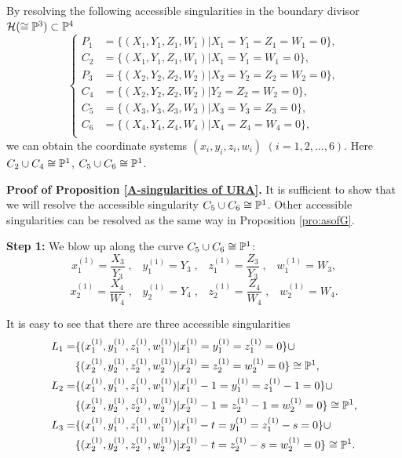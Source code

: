 \begin{prop}\label{A-singularities of URA}
By resolving the following accessible singularities in the boundary divisor ${\mathcal H} (\cong {\Bbb P}^3) \subset {\Bbb P}^4$
\begin{equation}
  \left\{
  \begin{aligned}
   P_1 &=\{(X_1,Y_1,Z_1,W_1)|X_1=Y_1=Z_1=W_1=0 \},\\
   C_2 &=\{(X_1,Y_1,Z_1,W_1)|X_1=Y_1=W_1=0 \},\\
   P_3 &=\{(X_2,Y_2,Z_2,W_2)|X_2=Y_2=Z_2=W_2=0\},\\
   C_4 &=\{(X_2,Y_2,Z_2,W_2)|Y_2=Z_2=W_2=0\},\\
   C_5 &=\{(X_3,Y_3,Z_3,W_3)|X_3=Y_3=Z_3=0\},\\
   C_6 &=\{(X_4,Y_4,Z_4,W_4)|X_4=Z_4=W_4=0\},\\
   \end{aligned}
  \right. 
\end{equation}
we can obtain the coordinate systems $(x_i,y_i,z_i,w_i)$ $(i=1,2,\dots,6)$. Here $C_2 \cup C_4 \cong {\Bbb P}^1$, $C_5 \cup C_6 \cong {\Bbb P}^1$.
\end{prop}

\noindent
{\bf Proof of Proposition \ref{A-singularities of URA}.}
It is sufficient to show that we will resolve the accessible singularity $C_5 \cup C_6 \cong {\Bbb P}^1$. Other accessible singularities can be resolved as the same way in Proposition \ref{pro:asofG}.

{\bf Step 1:} We blow up along the curve $C_5 \cup C_6 \cong {\Bbb P}^1${\rm : \rm}
$$
{x_{1}^{(1)}}=\frac{X_3}{Y_3} \;, \;\;\; {y_{1}^{(1)}}=Y_3 \;, \;\;\; {z_{1}^{(1)}}=\frac{Z_3}{Y_3} \;, \;\;\; {w_{1}^{(1)}}=W_3,
$$
$$
{x_{2}^{(1)}}=\frac{X_4}{W_4} \;, \;\;\; {y_{2}^{(1)}}=Y_4 \;, \;\;\; {z_{2}^{(1)}}=\frac{Z_4}{W_4} \;, \;\;\; {w_{2}^{(1)}}=W_4.
$$

It is easy to see that there are three accessible singularities
\begin{align*}
L_1=&\{(x_{1}^{(1)},y_{1}^{(1)},z_{1}^{(1)},w_{1}^{(1)})|x_{1}^{(1)}=y_{1}^{(1)}=z_{1}^{(1)}=0 \} \cup\\
&\{(x_{2}^{(1)},y_{2}^{(1)},z_{2}^{(1)},w_{2}^{(1)})|x_{2}^{(1)}=z_{2}^{(1)}=w_{2}^{(1)}=0 \} \cong {\Bbb P}^1,\\
L_2=&\{(x_{1}^{(1)},y_{1}^{(1)},z_{1}^{(1)},w_{1}^{(1)})| x_{1}^{(1)}-1=y_{1}^{(1)}=z_{1}^{(1)}-1=0 \} \cup\\
&\{(x_{2}^{(1)},y_{2}^{(1)},z_{2}^{(1)},w_{2}^{(1)})|x_{2}^{(1)}-1=z_{2}^{(1)}-1=w_{2}^{(1)}=0 \} \cong {\Bbb P}^1,\\
L_3=&\{(x_{1}^{(1)},y_{1}^{(1)},z_{1}^{(1)},w_{1}^{(1)})|x_{1}^{(1)}-t=y_{1}^{(1)}=z_{1}^{(1)}-s=0 \} \cup\\
&\{(x_{2}^{(1)},y_{2}^{(1)},z_{2}^{(1)},w_{2}^{(1)})|x_{2}^{(1)}-t=z_{2}^{(1)}-s=w_{2}^{(1)}=0 \} \cong {\Bbb P}^1.
\end{align*}


